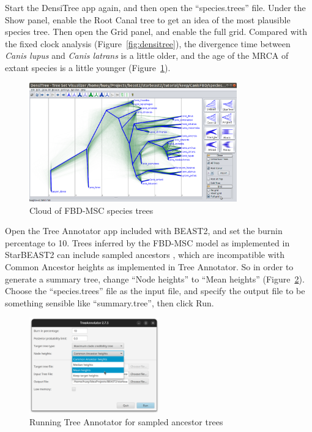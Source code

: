 \documentclass[12pt]{article}
\begin{document}
Start the DensiTree app again, and then open the ``species.trees'' file. Under
the Show panel, enable the Root Canal tree to get an idea of the most
plausible species tree. Then open the Grid panel, and enable the full grid.
Compared with the fixed clock analysis (Figure~\ref{fig:densitree}), the
divergence time between \textit{Canis lupus} and \textit{Canis latrans} is a
little older, and the age of the MRCA of extant species is a little younger
(Figure~\ref{fig:densitreeSA}).

\begin{figure}[htb!]
\centering
\includegraphics[width=0.8\textwidth]{figures/densitreeSA.png}
\caption
{Cloud of FBD-MSC species trees}
\label{fig:densitreeSA}
\end{figure}

Open the Tree Annotator app included with BEAST2, and set the burnin
percentage to 10. Trees inferred by the FBD-MSC model as implemented in
StarBEAST2 can include sampled ancestors \parencite{Gavryushkina2014}, which are
incompatible with Common Ancestor heights \parencite{Heled2013} as implemented in
Tree Annotator. So in order to generate a summary tree, change ``Node heights'' to
``Mean heights'' (Figure~\ref{fig:treeAnnotatorMeanHeights}). Choose the
``species.trees'' file as the input file, and specify the output file to be
something sensible like ``summary.tree'', then click Run.

\begin{figure}[htb!]
\centering
\includegraphics[width=0.5\textwidth]{figures/treeAnnotatorMeanHeights.png}
\caption
{Running Tree Annotator for sampled ancestor trees}
\label{fig:treeAnnotatorMeanHeights}
\end{figure}
\end{document}
